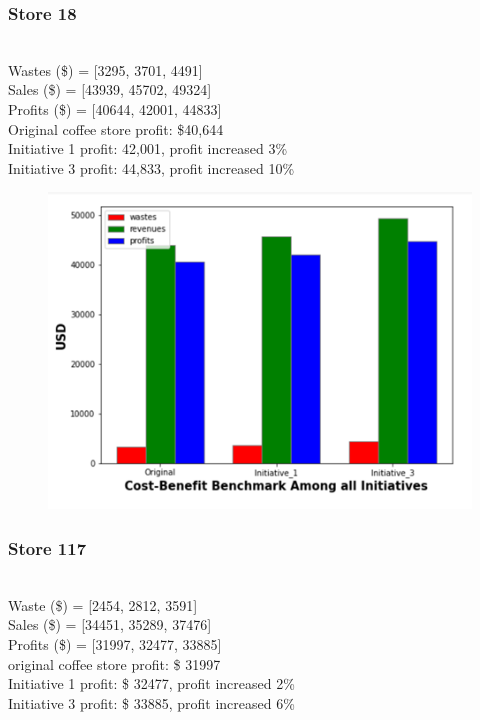 \subsubsection{Store 18} \\
Wastes (\$) = [3295, 3701, 4491]  \\
Sales (\$) = [43939, 45702, 49324] \\ 
Profits (\$) = [40644, 42001, 44833] \\
Original coffee store profit: \$40,644 \\
Initiative 1 profit: 42,001, profit increased 3\% \\
Initiative 3 profit: 44,833, profit increased 10\% \\

\begin{figure}[ht]
    \centering
    \includegraphics[width = 0.7\linewidth]{figures/section1.png}
\end{figure}

\newpage


\subsubsection{Store 117}  \\
Waste (\$) = [2454, 2812, 3591]  \\
Sales (\$) = [34451, 35289, 37476]  \\
Profits (\$) = [31997, 32477, 33885] \\
original coffee store profit: \$ 31997  \\
Initiative 1 profit: \$ 32477, profit increased 2\%  \\
Initiative 3 profit: \$ 33885, profit increased 6\%  \\

